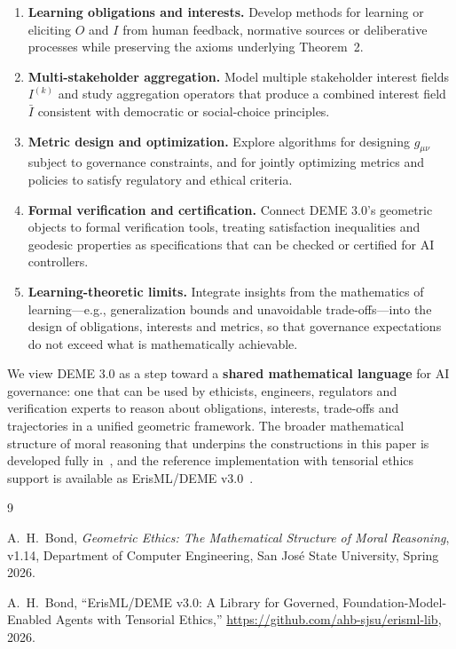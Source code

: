 \documentclass[12pt]{article}
\theoremstyle{remark}
\begin{document}
\begin{enumerate}
    \item \textbf{Learning obligations and interests.}
    Develop methods for learning or eliciting $O$ and $I$ from human feedback, normative sources or deliberative processes while preserving the axioms underlying Theorem~2.

    \item \textbf{Multi-stakeholder aggregation.}
    Model multiple stakeholder interest fields $I^{(k)}$ and study aggregation operators that produce a combined interest field $\bar{I}$ consistent with democratic or social-choice principles.

    \item \textbf{Metric design and optimization.}
    Explore algorithms for designing $g_{\mu\nu}$ subject to governance constraints, and for jointly optimizing metrics and policies to satisfy regulatory and ethical criteria.

    \item \textbf{Formal verification and certification.}
    Connect DEME 3.0's geometric objects to formal verification tools, treating satisfaction inequalities and geodesic properties as specifications that can be checked or certified for AI controllers.

    \item \textbf{Learning-theoretic limits.}
    Integrate insights from the mathematics of learning---e.g., generalization bounds and unavoidable trade-offs---into the design of obligations, interests and metrics, so that governance expectations do not exceed what is mathematically achievable.
\end{enumerate}

We view DEME 3.0 as a step toward a \textbf{shared mathematical language} for AI governance: one that can be used by ethicists, engineers, regulators and verification experts to reason about obligations, interests, trade-offs and trajectories in a unified geometric framework. The broader mathematical structure of moral reasoning that underpins the constructions in this paper is developed fully in~\cite{bond2026ge}, and the reference implementation with tensorial ethics support is available as ErisML/DEME v3.0~\cite{bond2026erisml}.

\begin{thebibliography}{9}

A.~H.~Bond, \emph{Geometric Ethics: The Mathematical Structure of Moral Reasoning}, v1.14, Department of Computer Engineering, San Jos\'e State University, Spring 2026.

A.~H.~Bond, ``ErisML/DEME v3.0: A Library for Governed, Foundation-Model-Enabled Agents with Tensorial Ethics,'' \url{https://github.com/ahb-sjsu/erisml-lib}, 2026.

\end{thebibliography}
\end{document}
